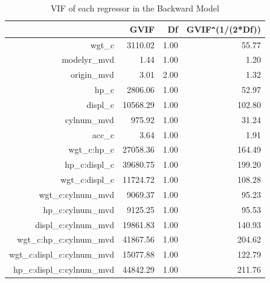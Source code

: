\documentclass{article}
\begin{document}
\begin{table}[ht]
\centering
\begin{tabular}{rrrr}
  \hline
 & GVIF & Df & GVIF\verb|^|(1/(2*Df)) \\ 
  \hline
wgt\_c & 3110.02 & 1.00 & 55.77 \\ 
  modelyr\_mvd & 1.44 & 1.00 & 1.20 \\ 
  origin\_mvd & 3.01 & 2.00 & 1.32 \\ 
  hp\_c & 2806.06 & 1.00 & 52.97 \\ 
  displ\_c & 10568.29 & 1.00 & 102.80 \\ 
  cylnum\_mvd & 975.92 & 1.00 & 31.24 \\ 
  acc\_c & 3.64 & 1.00 & 1.91 \\ 
  wgt\_c:hp\_c & 27058.36 & 1.00 & 164.49 \\ 
  hp\_c:displ\_c & 39680.75 & 1.00 & 199.20 \\ 
  wgt\_c:displ\_c & 11724.72 & 1.00 & 108.28 \\ 
  wgt\_c:cylnum\_mvd & 9069.37 & 1.00 & 95.23 \\ 
  hp\_c:cylnum\_mvd & 9125.25 & 1.00 & 95.53 \\ 
  displ\_c:cylnum\_mvd & 19861.83 & 1.00 & 140.93 \\ 
  wgt\_c:hp\_c:cylnum\_mvd & 41867.56 & 1.00 & 204.62 \\ 
  wgt\_c:displ\_c:cylnum\_mvd & 15077.88 & 1.00 & 122.79 \\ 
  hp\_c:displ\_c:cylnum\_mvd & 44842.29 & 1.00 & 211.76 \\ 
   \hline
\end{tabular}
\caption{VIF of each regressor in the Backward Model}
\label{tab:backwardmodelvif}
\end{table}

\clearpage
\newpage 
\end{document}
